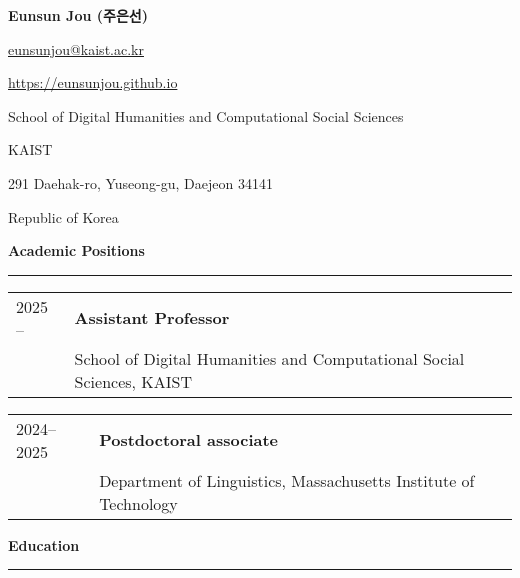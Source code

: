\documentclass[10pt]{article}
\newcommand{\sect}[1]{\vspace{5mm} {\fontsize{14}{21}\selectfont \textbf{#1}} {\vspace{0.1cm}} \hrule {\vspace{0.3cm}}}
\begin{document}
\begin{center}
{\Large \textbf{Eunsun Jou ({\batangfont 주은선})}}
\end{center}

\thispagestyle{firstpage}


\begin{minipage}[t]{0.39\textwidth}
\begin{flushleft}
\href{mailto:eunsunjou@kaist.ac.kr}{eunsunjou@kaist.ac.kr}

\href{https://eunsunjou.github.io}{https://eunsunjou.github.io}
\end{flushleft}
\end{minipage}
\begin{minipage}[t]{0.6\textwidth}
\begin{flushright}
School of Digital Humanities and Computational Social Sciences

KAIST

291 Daehak-ro, Yuseong-gu, Daejeon 34141

Republic of Korea

\end{flushright}
\end{minipage}




\sect{Academic Positions}

\begin{tabular}{@{}p{}p{}}
{2025 --}&{\textbf{Assistant Professor}}\\
{}&{School of Digital Humanities and Computational Social Sciences, KAIST}\\
\end{tabular}

\vspace{2mm}

\begin{tabular}{@{}p{}p{}} %
{2024--2025}&{\textbf{Postdoctoral associate}}\\
{}&{Department of Linguistics, Massachusetts Institute of Technology}\\
\end{tabular}

\sect{Education}
\end{document}
